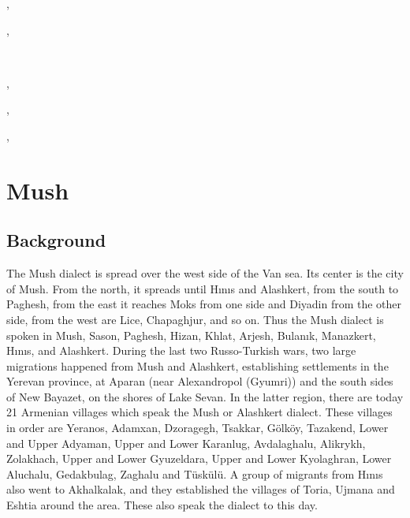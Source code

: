 ,

,


~ 


,

,

,






\chapter{Mush}\label{chapter:Mush}
\section{Background}

\begin{adjarianpage}\label{page:116}\end{adjarianpage}%

The Mush dialect is spread over the west side of the Van sea. Its center is the city of Mush. From the north, it spreads until Hınıs and Alashkert, from the south to Paghesh, from the east it reaches Moks from one side and Diyadin from the other side, from the west are Lice, Chapaghjur, and so on. Thus the Mush dialect is spoken in Mush, Sason, Paghesh, Hizan, Khlat, Arjesh, Bulanık, Manazkert, Hınıs, and Alashkert. During the last two Russo-Turkish wars, two large migrations happened from Mush and Alashkert, establishing settlements in the Yerevan province, at Aparan (near Alexandropol (Gyumri)) and the south sides of New Bayazet, on the shores of Lake Sevan. In the latter region, there are today 21 Armenian villages which speak the Mush or Alashkert dialect. These villages in order are Yeranos, Adamxan, Dzoragegh, Tsakkar, Gölköy, Tazakend, Lower and Upper Adyaman, Upper and Lower Karanlug, Avdalaghalu, Alikrykh, Zolakhach, Upper and Lower Gyuzeldara, Upper and Lower Kyolaghran, Lower Aluchalu, Gedakbulag, Zaghalu and Tüskülü. A group of migrants from Hınıs also went to Akhalkalak, and they established the villages of Toria, Ujmana and Eshtia around the area. These also speak the dialect to this day.



